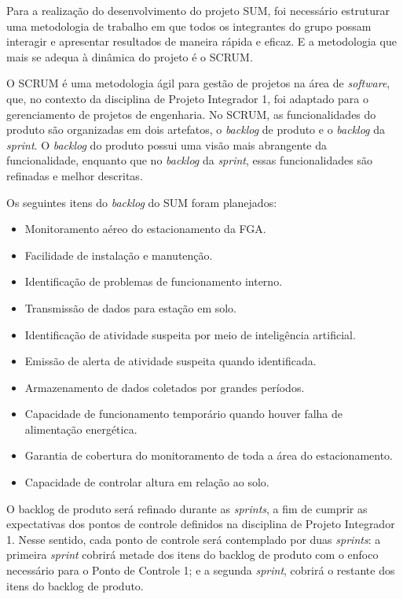   Para a realização do desenvolvimento do projeto SUM, foi necessário estruturar uma metodologia de trabalho em que todos os integrantes do grupo possam interagir e apresentar resultados de maneira rápida e eficaz. E a metodologia que mais se adequa à dinâmica do projeto é o SCRUM.

  O SCRUM é uma metodologia ágil para gestão de projetos na área de \emph{software}, que, no contexto da disciplina de Projeto Integrador 1, foi adaptado para o gerenciamento de projetos de engenharia.
  No SCRUM, as funcionalidades do produto são organizadas em dois artefatos, o \emph{backlog} de produto e o \emph{backlog} da \emph{sprint}. O \emph{backlog} do produto possui uma visão mais abrangente da funcionalidade, enquanto que no \emph{backlog} da \emph{sprint}, essas funcionalidades são refinadas e melhor descritas.

  Os seguintes itens do \emph{backlog} do SUM foram planejados:

  \begin{itemize}
    \item Monitoramento aéreo do estacionamento da FGA.
    \item Facilidade de instalação e manutenção.
    \item Identificação de problemas de funcionamento interno.
    \item Transmissão de dados para estação em solo.
    \item Identificação de atividade suspeita por meio de inteligência artificial.
    \item Emissão de alerta de atividade suspeita quando identificada.
    \item Armazenamento de dados coletados por grandes períodos.
    \item Capacidade de funcionamento temporário quando houver falha de alimentação  energética.
    \item Garantia de cobertura do monitoramento de toda a área do estacionamento.
    \item Capacidade de controlar altura em relação ao solo.
\end{itemize}

  O backlog de produto será refinado durante as \emph{sprints}, a fim de cumprir as expectativas dos pontos de controle definidos na disciplina de Projeto Integrador 1. Nesse sentido, cada ponto de controle será contemplado por duas \emph{sprints}: a primeira \emph{sprint} cobrirá metade dos itens do backlog de produto com o enfoco necessário para o Ponto de Controle 1; e a segunda \emph{sprint}, cobrirá o restante dos itens do backlog de produto.

